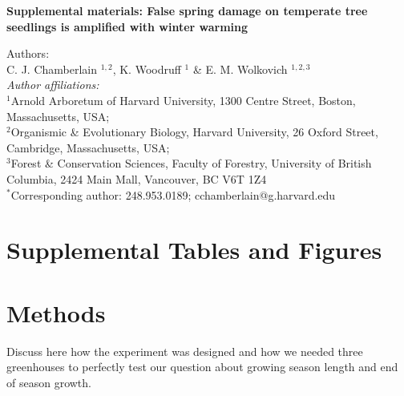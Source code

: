 \documentclass{article}\usepackage[]{graphicx}\usepackage[]{color}
\begin{document}
\noindent \textbf{\Large{Supplemental materials: False spring damage on temperate tree seedlings is amplified with winter warming}}

\noindent Authors:\\
C. J. Chamberlain $^{1,2}$, K. Woodruff $^{1}$ \& E. M. Wolkovich $^{1,2,3}$
\vspace{2ex}\\
\emph{Author affiliations:}\\
$^{1}$Arnold Arboretum of Harvard University, 1300 Centre Street, Boston, Massachusetts, USA; \\
$^{2}$Organismic \& Evolutionary Biology, Harvard University, 26 Oxford Street, Cambridge, Massachusetts, USA; \\
$^{3}$Forest \& Conservation Sciences, Faculty of Forestry, University of British Columbia, 2424 Main Mall, Vancouver, BC V6T 1Z4\\
\vspace{2ex}
$^*$Corresponding author: 248.953.0189; cchamberlain@g.harvard.edu\\

\renewcommand{\thetable}{S\arabic{table}}
\renewcommand{\thefigure}{S\arabic{figure}}
\renewcommand{\labelitemi}{$-$}

\section*{Supplemental Tables and Figures}


\section*{Methods}

Discuss here how the experiment was designed and how we needed three greenhouses to perfectly test our question about growing season length and end of season growth.
\end{document}
